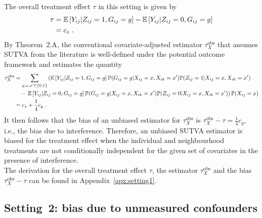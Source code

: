 \documentclass[10pt]{article}
\begin{document}
The overall treatment effect $\tau$ in this setting is given by
\begin{align*}
\tau &= \mathbb{E}\left[Y_{ij}|Z_{ij}=1,G_{ij}=g\right] - \mathbb{E}\left[Y_{ij}|Z_{ij}=0,G_{ij}=g\right] \\
&= c_z \;.
\end{align*}
By Theorem~2.A, the conventional covariate-adjusted estimator $\tau_{X}^\text{obs}$ that assumes SUTVA from the literature is well-defined under the potential outcome framework and estimates the quantity
\begin{align*}
\tau_{X}^\text{obs} &= \sum_{g,x,x'\in\{0,1\}}\left(\mathbb{E}\left[Y_{ij}|Z_{ij}=1,G_{ij}=g\right]\mathbb{P}(G_{ij}=g|X_{ij}=x,X_{ik}=x')\mathbb{P}(Z_{ij}=1|X_{ij}=x,X_{ik}=x')\right. \\
&\quad - \left.\mathbb{E}\left[Y_{ij}|Z_{ij}=0,G_{ij}=g\right]\mathbb{P}(G_{ij}=g|X_{ij}=x,X_{ik}=x')\mathbb{P}(Z_{ij}=0|X_{ij}=x,X_{ik}=x')\right)\mathbb{P}(X_{ij}=x) \\
&= c_z + \frac{1}{4}c_g \;.
\end{align*}
It then follows that the bias of an unbiased estimator for $\tau_{X}^\text{obs}$ is $\tau_{X}^\text{obs} - \tau = \frac{1}{4}c_g$, i.e., the bias due to interference. Therefore, an unbiased SUTVA estimator is biased for the treatment effect when the individual and neighbourhood treatments are not conditionally independent for the given set of covariates in the presence of interference.
\\

The derivation for the overall treatment effect $\tau$, the estimator $\tau_{X}^\text{obs}$ and the bias $\tau_{X}^\text{obs}-\tau$ can be found in Appendix~\ref{apx:setting1}.

\subsection{Setting~2: bias due to unmeasured confounders}
\end{document}
